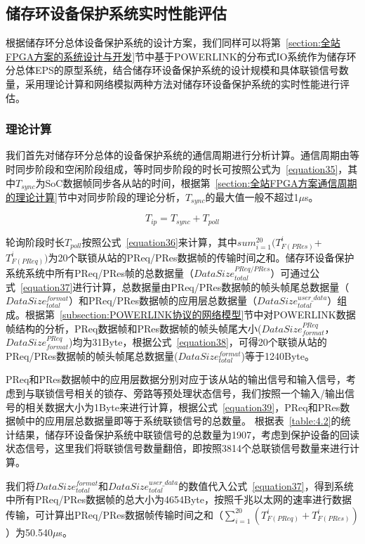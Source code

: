 \subsection{储存环设备保护系统实时性能评估}

根据储存环分总体设备保护系统的设计方案，我们同样可以将第~\ref{section:全站FPGA方案的系统设计与开发}节中基于POWERLINK的分布式IO系统作为储存环分总体EPS的原型系统，结合储存环设备保护系统的设计规模和具体联锁信号数量，采用理论计算和网络模拟两种方法对储存环设备保护系统的实时性能进行评估。

\subsubsection{理论计算}

我们首先对储存环分总体的设备保护系统的通信周期进行分析计算。通信周期由等时同步阶段和空闲阶段组成，等时同步阶段的时长可按照公式为~\ref{equation35}，其中$T_{sync}$为SoC数据帧同步各从站的时间，根据第~\ref{section:全站FPGA方案通信周期的理论计算}节中对同步阶段的理论分析，$T_{sync}$的最大值一般不超过1$\mu$s。

\begin{equation}
\label{equation35}
T_{ip}=T_{sync}+T_{poll}
\end{equation}

轮询阶段时长$T_{poll}$按照公式~\ref{equation36}来计算，其中$sum_{i=1}^{20}(T_{F(PRes)}^{i}$+$T_{F(PReq)}^{i})$为20个联锁从站的PReq/PRes数据帧的传输时间之和。储存环设备保护系统系统中所有PReq/PRes帧的总数据量（$DataSize_{total}^{PReq/PRes}$）可通过公式~\ref{equation37}进行计算，总数据量由PReq/PRes数据帧的帧头帧尾总数据量（$DataSize_{total}^{format}$）和PReq/PRes数据帧的应用层总数据量（$DataSize_{total}^{user\_data}$）组成。根据第~\ref{subsection:POWERLINK协议的网络模型}节中对POWERLINK数据帧结构的分析，PReq数据帧和PRes数据帧的帧头帧尾大小($DataSize_{format}^{PReq}$，$DataSize_{format}^{PReq}$)均为31Byte，根据公式~\ref{equation38}，可得20个联锁从站的PReq/PRes数据帧的帧头帧尾总数据量($DataSize_{total}^{format}$)等于1240Byte。

PReq和PRes数据帧中的应用层数据分别对应于该从站的输出信号和输入信号，考虑到与联锁信号相关的锁存、旁路等预处理状态信号，我们按照一个输入/输出信号的相关数据大小为1Byte来进行计算，根据公式~\ref{equation39}，PReq和PRes数据帧中的应用层总数据量即等于系统联锁信号的总数量。
根据表~\ref{table:4.2}的统计结果，储存环设备保护系统中联锁信号的总数量为1907，考虑到保护设备的回读状态信号，这里我们将联锁信号数量翻倍，即按照3814个总联锁信号数量来进行计算。


我们将$DataSize_{total}^{format}$和$DataSize_{total}^{user\_data}$的数值代入公式~\ref{equation37}，得到系统中所有PReq/PRes数据帧的总大小为4654Byte，按照千兆以太网的速率进行数据传输，可计算出PReq/PRes数据帧传输时间之和（$\sum_{i=1}^{20}(T_{F(PReq)}^{i}+T_{F(PRes)}^{i})$）为50.540$\mu$s。

